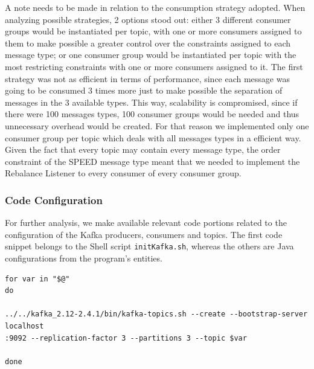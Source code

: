 \documentclass[12pt]{article}
\begin{document}
A note needs to be made in relation to the consumption strategy adopted.
When analyzing possible strategies, 2 options stood out: either 3 different consumer groups would be instantiated per topic, with one or more consumers assigned 
to them to make possible a greater control over the constraints assigned to each message type; or one consumer group would be instantiated per topic with the 
most restricting constraints with one or more consumers assigned to it. 
The first strategy was not as efficient in terms of performance, since each message was going to be consumed 3 times more just to make possible the separation 
of messages in the 3 available types. 
This way, scalability is compromised, since if there were 100 messages types, 100 consumer groups would be needed and thus unnecessary overhead would be created.
For that reason we implemented only one consumer group per topic which deals with all messages types in a efficient way. 
Given the fact that every topic may contain every message type, the order constraint of the SPEED message type meant that we needed to implement the Rebalance 
Listener to every consumer of every consumer group.

\newpage
\subsubsection{Code Configuration}

For further analysis, we make available relevant code portions related to the configuration of the Kafka producers, consumers and topics.
The first code snippet belongs to the Shell script \texttt{initKafka.sh}, whereas the others are Java configurations from the program's entities. 

\vspace{2pt}
\begingroup
\fontsize{9pt}{10pt}\selectfont
\begin{verbatim}
for var in "$@"
do

../../kafka_2.12-2.4.1/bin/kafka-topics.sh --create --bootstrap-server localhost
:9092 --replication-factor 3 --partitions 3 --topic $var

done
\end{verbatim}
\endgroup
\end{document}
